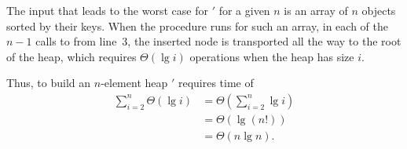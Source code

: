 The input that leads to the worst case for $'$ for a given $n$ is an array of $n$ objects sorted by their keys.
When the procedure runs for such an array, in each of the $n-1$ calls to  from line~3, the inserted node is transported all the way to the root of the heap, which requires $\Theta(\lg i)$ operations when the heap has size $i$.

Thus, to build an $n$-element heap $'$ requires time of
\begin{align*}
    \sum_{i=2}^n\Theta(\lg i) &= \Theta\left(\sum_{i=2}^n\lg i\right) \\
    &= \Theta(\lg(n!)) \\
    &= \Theta(n\lg n).
\end{align*}
